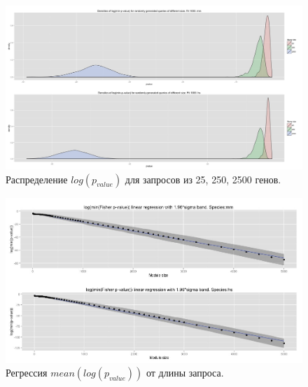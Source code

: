 \documentclass[10pt,pdf,utf8,russian,aspectratio=169]{beamer}
\begin{document}
\begin{frame}
    \begin{figure}[!ht]
        \centering
        \caption{Распределение $log(p_{value})$ для запросов из 25, 250, 2500 генов.}
        \includegraphics[width=\textwidth]{./img/densities_size_25_25_2500_fit_1000.jpeg}
    \end{figure}
\end{frame}

\begin{frame}
    \begin{figure}[!ht]
        \centering
        \caption{Регрессия $mean(log(p_{value}))$ от длины запроса.}
        \includegraphics[width=\textwidth]{./img/mean_linear_regression_with_confidence.jpeg}
    \end{figure}
\end{frame}
\end{document}

